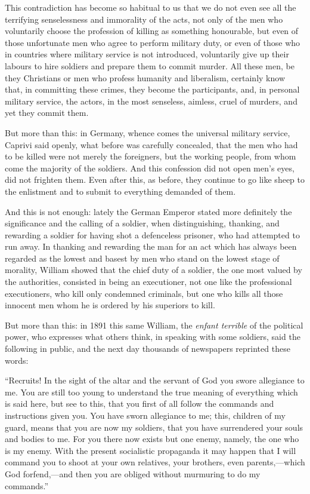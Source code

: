 \documentclass{book}
\begin{document}
This contradiction has become so habitual to us that we do not even see all the terrifying senselessness and immorality of the acts, not only of the men who voluntarily choose the profession of killing as something honourable, but even of those unfortunate men who agree to perform military duty, or even of those who in countries where military service is not introduced, voluntarily give up their labours to hire soldiers and prepare them to commit murder. All these men, be they Christians or men who profess humanity and liberalism, certainly know that, in committing these crimes, they become the participants, and, in personal military service, the actors, in the most senseless, aimless, cruel of murders, and yet they commit them.

But more than this: in Germany, whence comes the universal military service, Caprivi said openly, what before was carefully concealed, that the men who had to be killed were not merely the foreigners, but the working people, from whom come the majority of the soldiers. And this confession did not open men’s eyes, did not frighten them. Even after this, as before, they continue to go like sheep to the enlistment and to submit to everything demanded of them.

And this is not enough: lately the German Emperor stated more definitely the significance and the calling of a soldier, when distinguishing, thanking, and rewarding a soldier for having shot a defenceless prisoner, who had attempted to run away. In thanking and rewarding the man for an act which has always been regarded as the lowest and basest by men who stand on the lowest stage of morality, William showed that the chief duty of a soldier, the one most valued by the authorities, consisted in being an executioner, not one like the professional executioners, who kill only condemned criminals, but one who kills all those innocent men whom he is ordered by his superiors to kill.

But more than this: in 1891 this same William, the \emph{enfant terrible} of the political power, who expresses what others think, in speaking with some soldiers, said the following in public, and the next day thousands of newspapers reprinted these words:

“Recruits! In the sight of the altar and the servant of God you swore allegiance to me. You are still too young to understand the true meaning of everything which is said here, but see to this, that you first of all follow the commands and instructions given you. You have sworn allegiance to me; this, children of my guard, means that you are now my soldiers, that you have surrendered your souls and bodies to me. For you there now exists but one enemy, namely, the one who is my enemy. With the present socialistic propaganda it may happen that I will command you to shoot at your own relatives, your brothers, even parents,—which God forfend,—and then you are obliged without murmuring to do my commands.”
\end{document}
